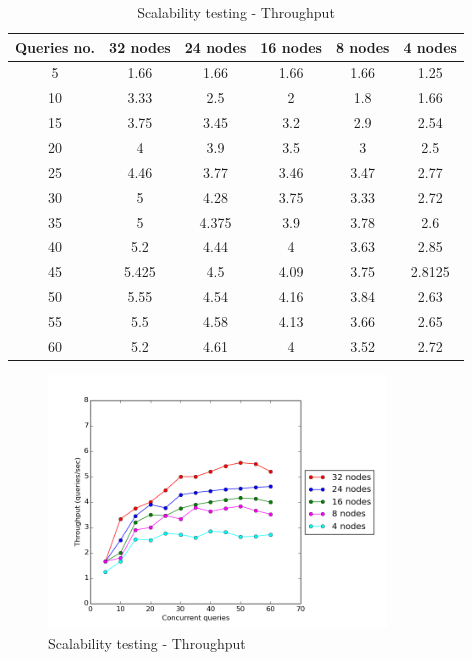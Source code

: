 \begin{table}[H]
\begin{center}
\begin{tabular}{|c|c|c|c|c|c|}
\hline
Queries no. & 32 nodes & 24 nodes & 16 nodes & 8 nodes & 4 nodes \\ \hline
5 & 1.66   & 1.66  & 1.66 & 1.66 & 1.25\\ \hline
10 & 3.33  & 2.5   & 2    & 1.8  & 1.66\\ \hline
15 & 3.75  & 3.45  & 3.2  & 2.9  & 2.54\\ \hline
20 & 4     & 3.9   & 3.5  & 3    & 2.5\\ \hline
25 & 4.46  & 3.77  & 3.46 & 3.47 & 2.77\\ \hline
30 & 5     & 4.28  & 3.75 & 3.33 & 2.72\\ \hline
35 & 5     & 4.375 & 3.9  & 3.78 & 2.6 \\ \hline
40 & 5.2   & 4.44  & 4    & 3.63 & 2.85 \\ \hline
45 & 5.425 & 4.5   & 4.09 & 3.75 & 2.8125 \\ \hline
50 & 5.55  & 4.54  & 4.16 & 3.84 & 2.63 \\ \hline
55 & 5.5   & 4.58  & 4.13 & 3.66 & 2.65 \\ \hline
60 & 5.2   & 4.61  & 4    & 3.52 & 2.72 \\ \hline
\end{tabular}
\end{center}
\caption{Scalability testing - Throughput}
\end{table}

\begin{figure}[H]
  \centering
  \includegraphics[width=0.8\textwidth]{figures/scalability_throughput.png}
  \caption{Scalability testing - Throughput}
\end{figure}

